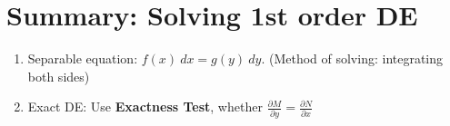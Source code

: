 \section*{Summary: Solving 1st order DE}

\begin{enumerate}
    \item Separable equation: $f(x) \>dx = g(y) \>dy$. (Method of solving: integrating both sides)
    \item Exact DE: Use \textbf{Exactness Test}, whether 
        $\displaystyle \frac{\partial M}{\partial y} = \frac{\partial N}{\partial x}$
\end{enumerate}
